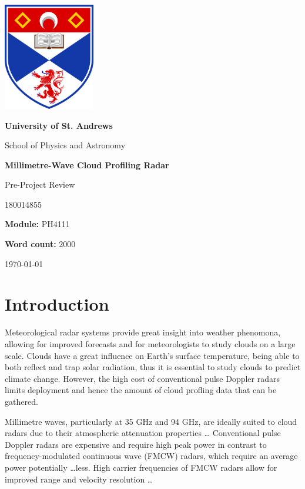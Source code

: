 \documentclass{article}
\title {\mytitle}
\author{\myauthor}
\date  {\mydate}
\newcommand\mytitle    {Millimetre-Wave Cloud Profiling Radar}
\newcommand\mysubtitle {Pre-Project Review}
\newcommand\myauthor   {180014855}
\newcommand\mymodule   {PH4111}
\newcommand\mywordcount{2000}
\begin{document}
\begin{titlepage}
	\centering
	{\includegraphics[width=0.3\textwidth]{uos-logo}}
	\par
	{\LARGE\bfseries University of St. Andrews\par}
	{\LARGE School of Physics and Astronomy\par}
	\vspace{1.5cm}
	{\huge\bfseries\mytitle\par}
	{\Large\mysubtitle\par}
	\vspace{2cm}
	{\Large\myauthor\par}
	{\large\textbf{Module:} \mymodule\par}
	{\large\textbf{Word count:} \mywordcount\par}
	\vfill
	{\large\today\par}
\end{titlepage}

\begin{abstract}
This work is about \dots
\end{abstract}

\section{Introduction}
Meteorological radar systems provide great insight into weather phenomona, allowing for improved forecasts and for meteorologists to study clouds on a large scale. Clouds have a great influence on Earth's surface temperature, being able to both reflect and trap solar radiation, thus it is essential to study clouds to predict climate change. However, the high cost of conventional pulse Doppler radars limits deployment and hence the amount of cloud profling data that can be gathered.

Millimetre waves, particularly at 35 GHz and 94 GHz, are ideally suited to cloud radars due to their atmospheric attenuation properties \dots
Conventional pulse Doppler radars are expensive and require high peak power in contrast to frequency-modulated continuous wave (FMCW) radars, which require an average power potentially \dots less.
High carrier frequencies of FMCW radars allow for improved range and velocity resolution \dots
\end{document}
